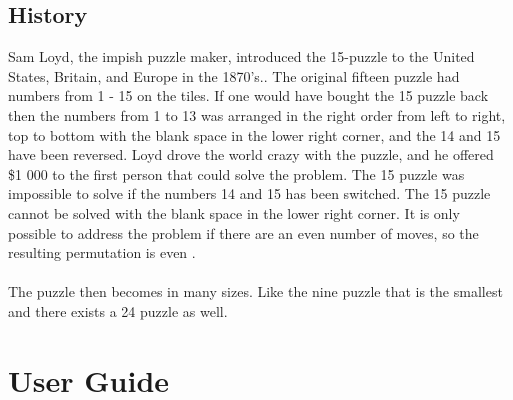 \documentclass[10pt]{article}
\begin{document}
\subsection{History}
Sam Loyd, the impish puzzle maker, introduced the 15-puzzle to the United States, Britain, and Europe in the 1870's.\cite{archer1999modern}.  The original fifteen puzzle had numbers from 1 - 15 on the tiles.  If one would have bought the 15 puzzle back then the numbers from 1 to 13 was arranged in the right order from left to right, top to bottom with the blank space in the lower right corner, and the 14 and 15 have been reversed. Loyd drove the world crazy with the puzzle, and he offered \$1 000 to the first person that could solve the problem. The 15 puzzle was impossible to solve if the numbers 14 and 15 has been switched. The 15 puzzle cannot be solved with the blank space in the lower right corner.  It is only possible to address the problem if there are an even number of moves, so the resulting permutation is even \cite{archer1999modern}.
\\
\\The puzzle then becomes in many sizes.  Like the nine puzzle that is the smallest and there exists a 24 puzzle as well.
\section{User Guide}
\end{document}
